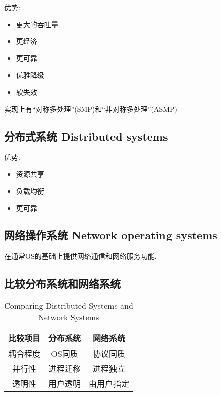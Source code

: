         优势:
        \begin{itemize}
            \item 更大的吞吐量
            \item 更经济
            \item 更可靠
            \item 优雅降级
            \item 软失效
        \end{itemize}

        实现上有``对称多处理''(SMP)和``非对称多处理''(ASMP)

    \subsection{分布式系统 Distributed systems}

        优势:
        \begin{itemize}
            \item 资源共享
            \item 负载均衡
            \item 更可靠
        \end{itemize}

    \subsection{网络操作系统 Network operating systems}

        在通常OS的基础上提供网络通信和网络服务功能.

    \subsection{比较分布系统和网络系统}

        \begin{table}[h]\centering
            \caption{Comparing Distributed Systems and Network Systems}
            \label{tab:2:comparing-distributed-network}
            \begin{tabular}{ccc}\toprule
                比较项目 & \bf 分布系统 & \bf 网络系统 \\ \midrule
                耦合程度 & OS同质 & 协议同质 \\
                并行性 & 进程迁移 & 进程独立 \\
                透明性 & 用户透明 & 由用户指定 \\
                \bottomrule
            \end{tabular}
        \end{table}

